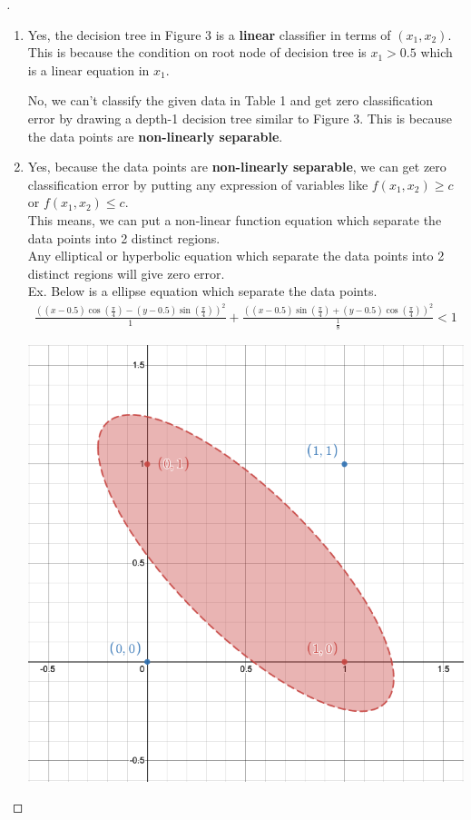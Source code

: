 \documentclass[a4paper, 12pt]{article}
\begin{document}
\begin{proof}[]
\begin{enumerate}[label={\color{blue}{\textbf{1.\arabic*})}}]
        
    \item 
        Yes, the decision tree in Figure 3 is a \textbf{linear} classifier in terms of $(x_1, x_2)$. This is because the condition on root node of decision tree is $x_1 > 0.5$ which is a linear equation in $x_1$.
        \smallskip
        
        No, we can't classify the given data in Table 1 and get zero classification error by drawing a depth-1 decision tree similar to Figure 3. This is because the data points are \textbf{non-linearly separable}. 
        
    
    \item
        Yes, because the data points are \textbf{non-linearly separable}, we can get zero classification error by putting any expression of variables like $f(x_1, x_2) \geq c$ or $f(x_1, x_2) \leq c$. \\
        This means, we can put a non-linear function equation which separate the data points into 2 distinct regions. \\
        Any elliptical or hyperbolic equation which separate the data points into 2 distinct regions will give zero error. \\
        Ex. Below is a ellipse equation which separate the data points. 
        \begin{align*}
            \frac{\left(\left(x-0.5\right)\cos\left(\frac{\pi}{4}\right)-\left(y-0.5\right)\sin\left(\frac{\pi}{4}\right)\right)^{2}}{1}+\frac{\left(\left(x-0.5\right)\sin\left(\frac{\pi}{4}\right)+\left(y-0.5\right)\cos\left(\frac{\pi}{4}\right)\right)^{2}}{\frac{1}{8}}<1
        \end{align*}
        \begin{center}
            \includegraphics[scale=0.35]{Ellipse}
        \end{center}
\end{enumerate}
\end{proof}
\end{document}
